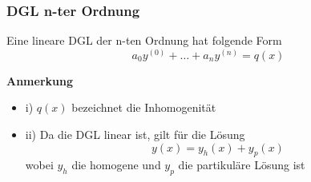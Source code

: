 \documentclass[a4paper, fontsize = 8pt, landscape]{scrartcl}
\newenvironment {annotation}[1]
				{\begin{itshape} \begin{small} \textbf{#1} \begin{itemize}}
				{\end{itemize} \end{small} \end{itshape}}
\begin{document}
\begin{multicols*}{3}
    \subsubsection*{DGL n-ter Ordnung}
    Eine lineare DGL der n-ten Ordnung hat folgende Form
    \begin{equation*}
        a_0y^{(0)}+\dots+ a_ny^{(n)}=q(x)
    \end{equation*}
    \begin{annotation}{Anmerkung}
        \item [i)]  $q(x)$ bezeichnet die Inhomogenität
        \item [ii)] Da die DGL linear ist, gilt für die Lösung
        \begin{equation*}
            y(x)=y_h(x)+y_p(x)
        \end{equation*}
        wobei $y_h$ die homogene und $y_p$ die partikuläre Lösung ist
    \end{annotation}

\end{multicols*}
\end{document}
